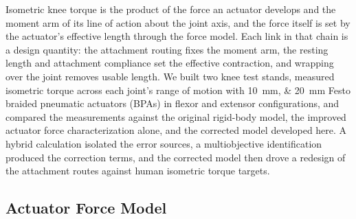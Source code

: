 Isometric knee torque is the product of the force an actuator develops and the moment arm of its line of action about the joint axis, and the force itself is set by the actuator's effective length through the force model. Each link in that chain is a design quantity: the attachment routing fixes the moment arm, the resting length and attachment compliance set the effective contraction, and wrapping over the joint removes usable length. We built two knee test stands, measured isometric torque across each joint's range of motion with \qtylist{10;20}{\mm} Festo braided pneumatic actuators (BPAs) in flexor and extensor configurations, and compared the measurements against the original rigid-body model, the improved actuator force characterization alone, and the corrected model developed here. A hybrid calculation isolated the error sources, a multiobjective identification produced the correction terms, and the corrected model then drove a redesign of the attachment routes against human isometric torque targets.

\subsection{Actuator Force Model}\label{sec:force_model}

